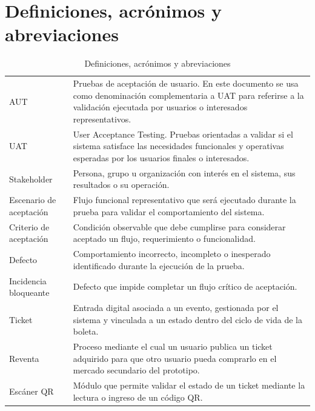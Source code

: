 \documentclass[12pt,letterpaper]{article}
\begin{document}
\section{Definiciones, acrónimos y abreviaciones}

\begin{table}[H]
\centering
\begingroup
\footnotesize
\setlength{\tabcolsep}{3pt}
\renewcommand{\arraystretch}{1.25}

\begin{tabularx}{\textwidth}{|
>{\raggedright\arraybackslash}p{3.4cm}|
>{\raggedright\arraybackslash}X|}
\hline
\multicolumn{1}{|>{\centering\arraybackslash}m{3.4cm}|}{\textbf{Término}} &
\multicolumn{1}{>{\centering\arraybackslash}m{10.8cm}|}{\textbf{Definición}} \\
\hline
AUT & Pruebas de aceptación de usuario. En este documento se usa como denominación complementaria a UAT para referirse a la validación ejecutada por usuarios o interesados representativos. \\
\hline
UAT & User Acceptance Testing. Pruebas orientadas a validar si el sistema satisface las necesidades funcionales y operativas esperadas por los usuarios finales o interesados. \\
\hline
Stakeholder & Persona, grupo u organización con interés en el sistema, sus resultados o su operación. \\
\hline
Escenario de aceptación & Flujo funcional representativo que será ejecutado durante la prueba para validar el comportamiento del sistema. \\
\hline
Criterio de aceptación & Condición observable que debe cumplirse para considerar aceptado un flujo, requerimiento o funcionalidad. \\
\hline
Defecto & Comportamiento incorrecto, incompleto o inesperado identificado durante la ejecución de la prueba. \\
\hline
Incidencia bloqueante & Defecto que impide completar un flujo crítico de aceptación. \\
\hline
Ticket & Entrada digital asociada a un evento, gestionada por el sistema y vinculada a un estado dentro del ciclo de vida de la boleta. \\
\hline
Reventa & Proceso mediante el cual un usuario publica un ticket adquirido para que otro usuario pueda comprarlo en el mercado secundario del prototipo. \\
\hline
Escáner QR & Módulo que permite validar el estado de un ticket mediante la lectura o ingreso de un código QR. \\
\hline
\end{tabularx}

\endgroup
\caption{Definiciones, acrónimos y abreviaciones}
\label{tab:definiciones-uat}
\end{table}
\end{document}
